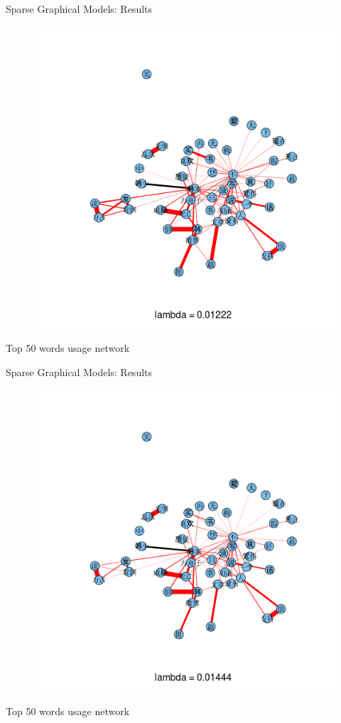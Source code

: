 \documentclass[12pt, trans]{beamer}
\newcommand{\1}[1]{{\mathbf 1}\left\{#1\right\}}        %
\begin{document}
\begin{frame}{Sparse Graphical Models: Results}

\begin{figure}
  \centering
  \includegraphics[height=0.9\textheight]{./../../gLassoResults/glasso2.png} 
\end{figure}
\center Top 50 words usage network

\end{frame}
\begin{frame}{Sparse Graphical Models: Results}

\begin{figure}
  \centering
  \includegraphics[height=0.9\textheight]{./../../gLassoResults/glasso3.png} 
\end{figure}
\center Top 50 words usage network

\end{frame}
\end{document}
